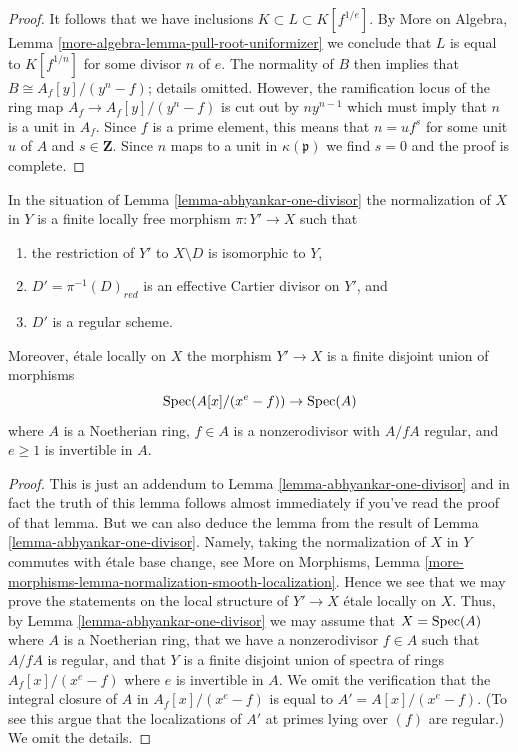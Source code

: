 \begin{proof}
\medskip\noindent
It follows that we have inclusions $K \subset L \subset K[f^{1/e}]$.
By More on Algebra, Lemma \ref{more-algebra-lemma-pull-root-uniformizer}
we conclude that $L$ is equal to $K[f^{1/n}]$ for some divisor $n$ of $e$.
The normality of $B$ then implies that $B \cong A_f[y]/(y^n - f)$; details
omitted.
However, the ramification locus of the ring map $A_f \to A_f[y]/(y^n - f)$
is cut out by $ny^{n - 1}$ which must imply that $n$ is a unit in $A_f$.
Since $f$ is a prime element, this means that $n = u f^s$ for
some unit $u$ of $A$ and $s \in \mathbf{Z}$. Since $n$ maps to a unit in
$\kappa(\mathfrak p)$ we find $s = 0$ and the proof is complete.
\end{proof}

\begin{lemma}
\label{lemma-extend-tame-covering-normal}
In the situation of Lemma \ref{lemma-abhyankar-one-divisor}
the normalization of $X$ in $Y$ is a finite locally free morphism
$\pi : Y' \to X$ such that
\begin{enumerate}
\item the restriction of $Y'$ to $X \setminus D$ is isomorphic to $Y$,
\item $D' = \pi^{-1}(D)_{red}$ is an effective Cartier divisor on $Y'$, and
\item $D'$ is a regular scheme.
\end{enumerate}
Moreover, \'etale locally on $X$ the morphism $Y' \to X$ is a finite disjoint
union of morphisms
$$
\mathop{\mathrm{Spec}}(A[x]/(x^e - f)) \to \mathop{\mathrm{Spec}}(A)
$$
where $A$ is a Noetherian ring, $f \in A$ is a nonzerodivisor with
$A/fA$ regular, and $e \geq 1$ is invertible in $A$.
\end{lemma}

\begin{proof}
This is just an addendum to Lemma \ref{lemma-abhyankar-one-divisor}
and in fact the truth of this lemma follows almost immediately if
you've read the proof of that lemma. But we can also deduce
the lemma from the result of Lemma \ref{lemma-abhyankar-one-divisor}.
Namely, taking the normalization of $X$ in $Y$ commutes with
\'etale base change, see More on Morphisms, Lemma
\ref{more-morphisms-lemma-normalization-smooth-localization}.
Hence we see that we may prove the statements on the local structure
of $Y' \to X$ \'etale locally on $X$. Thus, by
Lemma \ref{lemma-abhyankar-one-divisor} we may assume that
$X = \mathop{\mathrm{Spec}}(A)$ where $A$ is a Noetherian ring, that we have a
nonzerodivisor $f\in A$ such that $A/fA$ is regular, and that $Y$
is a finite disjoint union of spectra of rings $A_f[x]/(x^e - f)$
where $e$ is invertible in $A$. We omit the verification that
the integral closure of $A$ in $A_f[x]/(x^e - f)$ is
equal to $A' = A[x]/(x^e - f)$. (To see this argue that
the localizations of $A'$ at primes lying over $(f)$ are regular.)
We omit the details.
\end{proof}

